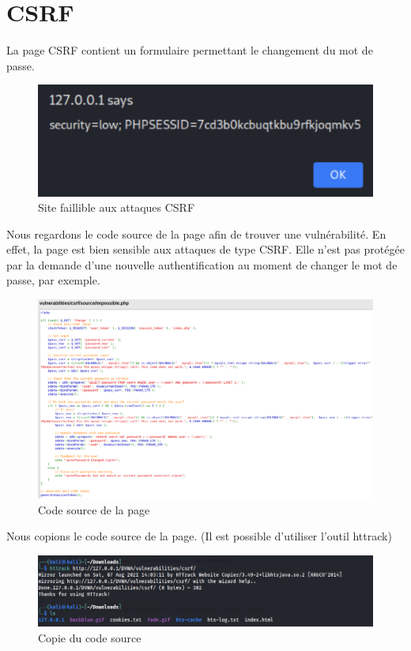 \documentclass[12pt, oneside]{article}
\begin{document}
\section{CSRF}
La page CSRF contient un formulaire permettant le changement du mot de passe.
\begin{figure}[H]
\centering
\includegraphics[scale=0.4]{16}
\caption{Site faillible aux attaques CSRF}
\end{figure}
Nous regardons le code source de la page afin de trouver une vulnérabilité. En effet, la page est bien sensible aux attaques de type CSRF. Elle n’est pas protégée par la demande d’une nouvelle authentification au moment de changer le mot de passe, par exemple.
\begin{figure}[H]
\centering
\includegraphics[scale=0.4]{17}
\caption{Code source de la page}
\end{figure}
Nous copions le code source de la page. (Il est possible d’utiliser l’outil httrack)
\begin{figure}[H]
\centering
\includegraphics[scale=0.3]{18}
\caption{Copie du code source}
\end{figure}
\end{document}
